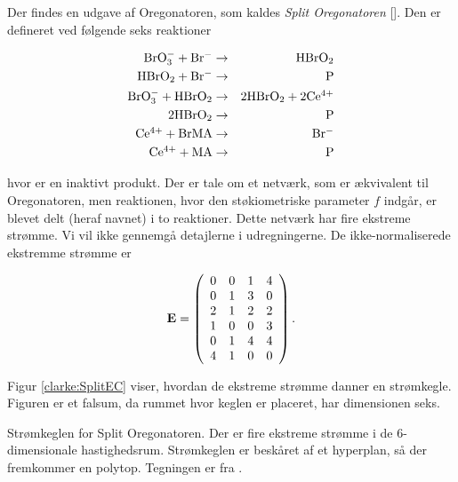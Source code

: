 Der findes en udgave af Oregonatoren, som kaldes {\em Split
Oregonatoren} []. Den er defineret ved
f{\o}lgende seks reaktioner

\begin{eqnarray*}
\mbox{$\rm BrO_3^-$} + \mbox{$\rm Br^-$} &\rightarrow& \mbox{$\rm HBrO_2$} \\
\mbox{$\rm HBrO_2$} + \mbox{$\rm Br^-$} &\rightarrow& \mbox{$\rm P$} \\
\mbox{$\rm BrO_3^-$} + \mbox{$\rm HBrO_2$} &\rightarrow& 2\mbox{$\rm HBrO_2$} +
2\mbox{$\rm Ce^{4+}$} \\
2\mbox{$\rm HBrO_2$} &\rightarrow& \mbox{$\rm P$} \\
\mbox{$\rm Ce^{4+}$} + \mbox{$\rm BrMA$} &\rightarrow& \mbox{$\rm Br^-$} \\
\mbox{$\rm Ce^{4+}$} + \mbox{$\rm MA$} &\rightarrow& \mbox{$\rm P$} \\
\end{eqnarray*}

hvor  er en inaktivt produkt. Der er tale om et
netv{\ae}rk, som er {\ae}kvivalent til Oregonatoren, men
reaktionen, hvor den st{\o}kiometriske parameter $f$
indg{\aa}r, er blevet delt (heraf navnet) i to reaktioner.
Dette netv{\ae}rk har fire ekstreme str{\o}mme. Vi vil ikke
gennemg{\aa} detajlerne i udregningerne. De
ikke-normaliserede ekstremme str{\o}mme er

\begin{equation}
\mbox{${\bf E}$} = \left(
\begin{array}{cccc}
0 & 0 & 1 & 4 \\
0 & 1 & 3 & 0 \\
2 & 1 & 2 & 2 \\
1 & 0 & 0 & 3 \\
0 & 1 & 4 & 4 \\
4 & 1 & 0 & 0 \\
\end{array}
\right).
\end{equation}

\noindent
Figur \ref{clarke:SplitEC} viser, hvordan de ekstreme
str{\o}mme danner en str{\o}mkegle. Figuren er et falsum,
da rummet hvor keglen er placeret, har dimensionen seks.

{
\vspace{5.0mm}
}
{
\caption{\protect\capsize
Str{\o}mkeglen for Split Oregonatoren. Der er fire ekstreme str{\o}mme i
de 6-dimensionale hastighedsrum. Str{\o}mkeglen er besk{\aa}ret af et
hyperplan, s{\aa} der fremkommer en polytop. Tegningen er fra
\protect\cite{tina1}.
\label{clarke:SplitEC}}
}

